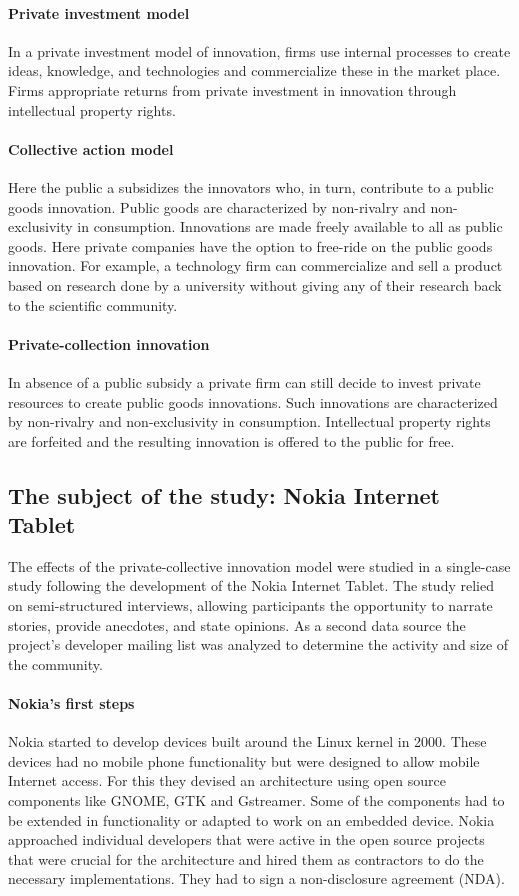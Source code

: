\documentclass[a4paper]{scrartcl}
\begin{document}
\paragraph{Private investment model}
In a private investment model of innovation, firms use internal processes to create ideas,
knowledge, and technologies and commercialize these in the market place. Firms appropriate
returns from private investment in innovation through intellectual property rights. 

\paragraph{Collective action model}
Here the public a subsidizes the innovators who, in turn, contribute to a public goods innovation.
Public goods are characterized by non-rivalry and non-exclusivity in consumption.
Innovations are made freely available to all as public goods.
Here private companies have the option to free-ride on the public goods innovation.
For example, a technology firm can commercialize and sell a product based on research done by a university without giving any of their research back to the scientific community. 

\paragraph{Private-collection innovation}
In absence of a public subsidy a private firm can still decide to invest private resources to create public goods innovations. 
Such innovations are characterized by non-rivalry and non-exclusivity
in consumption.
Intellectual property rights are forfeited and the resulting innovation is offered to
the public for free.


\subsection{The subject of the study: Nokia Internet Tablet}

The effects of the private-collective innovation model were studied in a single-case study following the development of the Nokia Internet Tablet.
The study relied on semi-structured interviews, allowing participants the opportunity
to narrate stories, provide anecdotes, and state opinions.
As a second data source the project's developer mailing list was analyzed to determine the activity and size of the community.

\paragraph{Nokia's first steps}
Nokia started to develop devices built around the Linux kernel in 2000.
These devices had no mobile phone functionality but were designed to allow mobile Internet access.
For this they devised an architecture using open source components like GNOME, GTK and Gstreamer.
Some of the components had to be extended in functionality or adapted to work on an embedded device.
Nokia approached individual developers that were active in the open source projects that were crucial for the architecture and hired them as contractors to do the necessary implementations.
They had to sign a non-disclosure agreement (NDA).
\end{document}
